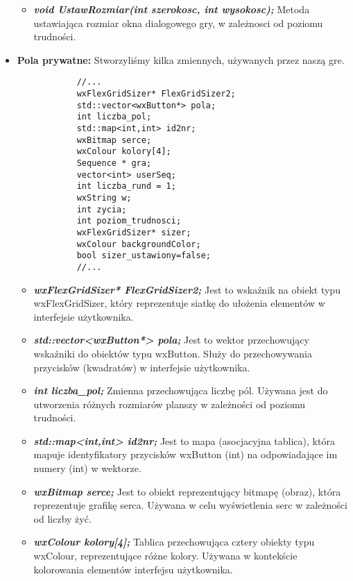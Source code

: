 \documentclass[]{report}
\begin{document}
\begin{itemize}
\begin{itemize}
			\item \textit{\textbf{void UstawRozmiar(int szerokosc, int wysokosc);}} Metoda ustawiająca rozmiar okna dialogowego gry, w zależnosci od poziomu trudności.
			
		\end{itemize}
		
		\item \textbf{Pola prywatne:} Stworzyliśmy kilka zmiennych, używanych przez naszą gre.
		
		\begin{lstlisting}
			//...
			wxFlexGridSizer* FlexGridSizer2;
			std::vector<wxButton*> pola;
			int liczba_pol;
			std::map<int,int> id2nr;
			wxBitmap serce;
			wxColour kolory[4];
			Sequence * gra;
			vector<int> userSeq;
			int liczba_rund = 1;
			wxString w;
			int zycia;
			int poziom_trudnosci;
			wxFlexGridSizer* sizer;
			wxColour backgroundColor;
			bool sizer_ustawiony=false;
			//...
		\end{lstlisting}
		
		\begin{itemize}
			\item \textit{\textbf{wxFlexGridSizer* FlexGridSizer2;}} Jest to wskaźnik na obiekt typu wxFlexGridSizer, który  reprezentuje siatkę do ułożenia elementów w interfejsie użytkownika.
			
			\item \textbf{\textit{std::vector<wxButton*> pola;}} Jest to wektor przechowujący wskaźniki do obiektów typu wxButton.  Służy do przechowywania przycisków (kwadratów) w interfejsie użytkownika.
			
			\item \textit{\textbf{int liczba\_pol;}} Zmienna przechowująca liczbę pól. Używana jest do utworzenia różnych rozmiarów planszy w zależności od poziomu trudności.
			
			\item \textit{\textbf{std::map<int,int> id2nr;}} Jest to mapa (asocjacyjna tablica), która mapuje identyfikatory przycisków wxButton (int) na odpowiadające im numery (int) w wektorze. 
			
			\item \textit{\textbf{wxBitmap serce;}} Jest to obiekt reprezentujący bitmapę (obraz), która reprezentuje grafikę serca. Używana w celu wyświetlenia serc w zależności od liczby żyć.
			
			\item \textit{\textbf{wxColour kolory[4];}} Tablica przechowująca cztery obiekty typu wxColour,  reprezentujące różne kolory. Używana w kontekście kolorowania elementów interfejsu użytkownika.
			

\end{itemize}
\end{itemize}
\end{document}

